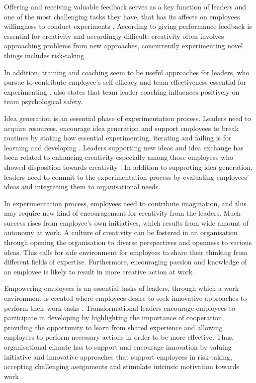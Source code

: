 Offering and receiving valuable feedback serves as a key function of leaders and one of the most challenging tasks they have, that has its affects on employees willingness to conduct experiments \citep{amabile2004leader,amabile1998kill}. According to \citet{shalley2004leaders} giving performance feedback is essential for creativity and accordingly difficult: creativity often involves approaching problems from new approaches, concurrently experimenting novel things includes risk-taking. 

In addition, training and coaching seem to be useful approaches for leaders, who pursue to contribute employee's self-efficacy and team effectiveness essential for experimenting \citep{amabile1998kill}. \citet{edmondson1999psychological} also states that team leader coaching influences positively on team psychological safety. 

Idea generation is an essential phase of experimentation process. Leaders need to acquire resources, encourage idea generation \citep{mcgourty1996managing} and support employees to break routines by stating how essential experimenting, iterating and failing is for learning and developing \citep{amabile2008creativity,shalley2004leaders}. Leaders supporting new ideas and idea exchange has been related to enhancing creativity especially among those employees who showed disposition towards creativity \citep{oldham1996employee}. In addition to supporting idea generation, leaders need to commit to the experimentation process by evaluating employees' ideas and integrating them to organisational needs\citep{mumford2002leading}.

In experimentation process, employees need to contribute imagination, and this may require new kind of encouragement for creativity from the leaders. Much success rises from employee's own initiatives, which results from wide amount of autonomy at work. \citep{amabile2008creativity} A culture of creativity can be fostered in an organisation through opening the organisation to diverse perspectives and openness to various ideas. This calls for safe environment for employees to share their thinking from different fields of expertise. Furthermore, encouraging passion and knowledge of an employee is likely to result in more creative action at work. \citep{amabile2008creativity}

Empowering employees is an essential tasks of leaders, through which a work environment is created where employees desire to seek innovative approaches to perform their work tasks \citep{jung2003role}. Transformational leaders encourage employees to participate in developing by highlighting the importance of cooperation, providing the opportunity to learn from shared experience and allowing employees to perform necessary actions in order to be more effective\citep{bass1990implications}. Thus, organisational climate has to support and encourage innovation \citep{mumford1988creativity} by valuing initiative and innovative approaches that support employees in risk-taking, accepting challenging assignments and stimulate intrinsic motivation towards work \citep{jung2003role}.

